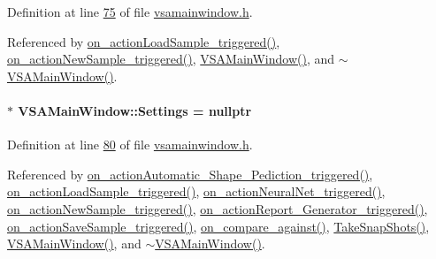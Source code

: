 Definition at line \hyperlink{vsamainwindow_8h_source_l00075}{75} of file \hyperlink{vsamainwindow_8h_source}{vsamainwindow.\+h}.



Referenced by \hyperlink{vsamainwindow_8cpp_source_l00475}{on\+\_\+action\+Load\+Sample\+\_\+triggered()}, \hyperlink{vsamainwindow_8cpp_source_l00361}{on\+\_\+action\+New\+Sample\+\_\+triggered()}, \hyperlink{vsamainwindow_8cpp_source_l00004}{V\+S\+A\+Main\+Window()}, and \hyperlink{vsamainwindow_8cpp_source_l00254}{$\sim$\+V\+S\+A\+Main\+Window()}.

\hypertarget{class_v_s_a_main_window_a429310b9a60f66c4283dc609f869b48d}{}
\paragraph[{Settings}]{$\ast$ V\+S\+A\+Main\+Window\+::\+Settings = nullptr\hspace{0.3cm}{\ttfamily [private]}}\label{class_v_s_a_main_window_a429310b9a60f66c4283dc609f869b48d}


Definition at line \hyperlink{vsamainwindow_8h_source_l00080}{80} of file \hyperlink{vsamainwindow_8h_source}{vsamainwindow.\+h}.



Referenced by \hyperlink{vsamainwindow_8cpp_source_l00541}{on\+\_\+action\+Automatic\+\_\+\+Shape\+\_\+\+Pediction\+\_\+triggered()}, \hyperlink{vsamainwindow_8cpp_source_l00475}{on\+\_\+action\+Load\+Sample\+\_\+triggered()}, \hyperlink{vsamainwindow_8cpp_source_l00353}{on\+\_\+action\+Neural\+Net\+\_\+triggered()}, \hyperlink{vsamainwindow_8cpp_source_l00361}{on\+\_\+action\+New\+Sample\+\_\+triggered()}, \hyperlink{vsamainwindow_8cpp_source_l00552}{on\+\_\+action\+Report\+\_\+\+Generator\+\_\+triggered()}, \hyperlink{vsamainwindow_8cpp_source_l00460}{on\+\_\+action\+Save\+Sample\+\_\+triggered()}, \hyperlink{vsamainwindow_8cpp_source_l00570}{on\+\_\+compare\+\_\+against()}, \hyperlink{vsamainwindow_8cpp_source_l00391}{Take\+Snap\+Shots()}, \hyperlink{vsamainwindow_8cpp_source_l00004}{V\+S\+A\+Main\+Window()}, and \hyperlink{vsamainwindow_8cpp_source_l00254}{$\sim$\+V\+S\+A\+Main\+Window()}.

\hypertarget{class_v_s_a_main_window_ae79d86cfa0c3adab847438b5b3dc34d6}{}
